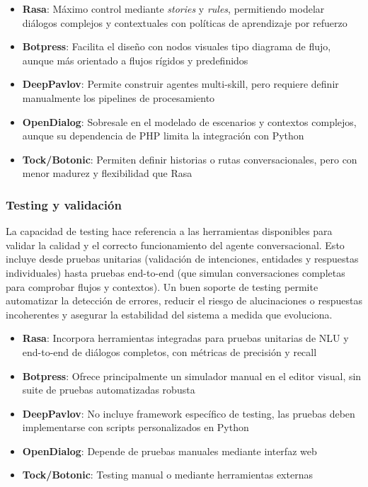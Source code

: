 \begin{itemize}
    \item \textbf{Rasa}: Máximo control mediante \textit{stories} y \textit{rules}, permitiendo modelar diálogos complejos y contextuales con políticas de aprendizaje por refuerzo
    \item \textbf{Botpress}: Facilita el diseño con nodos visuales tipo diagrama de flujo, aunque más orientado a flujos rígidos y predefinidos
    \item \textbf{DeepPavlov}: Permite construir agentes multi-skill, pero requiere definir manualmente los pipelines de procesamiento
    \item \textbf{OpenDialog}: Sobresale en el modelado de escenarios y contextos complejos, aunque su dependencia de PHP limita la integración con Python
    \item \textbf{Tock/Botonic}: Permiten definir historias o rutas conversacionales, pero con menor madurez y flexibilidad que Rasa
\end{itemize}

\subsubsection{Testing y validación}

La capacidad de testing hace referencia a las herramientas disponibles para validar la calidad y el correcto funcionamiento del agente conversacional. Esto incluye desde pruebas unitarias (validación de intenciones, entidades y respuestas individuales) hasta pruebas end-to-end (que simulan conversaciones completas para comprobar flujos y contextos). Un buen soporte de testing permite automatizar la detección de errores, reducir el riesgo de alucinaciones o respuestas incoherentes y asegurar la estabilidad del sistema a medida que evoluciona.

\begin{itemize}
    \item \textbf{Rasa}: Incorpora herramientas integradas para pruebas unitarias de NLU y end-to-end de diálogos completos, con métricas de precisión y recall
    \item \textbf{Botpress}: Ofrece principalmente un simulador manual en el editor visual, sin suite de pruebas automatizadas robusta
    \item \textbf{DeepPavlov}: No incluye framework específico de testing, las pruebas deben implementarse con scripts personalizados en Python
    \item \textbf{OpenDialog}: Depende de pruebas manuales mediante interfaz web
    \item \textbf{Tock/Botonic}: Testing manual o mediante herramientas externas
\end{itemize}

